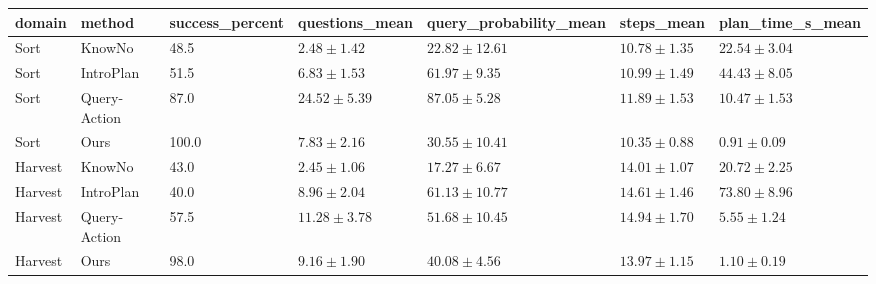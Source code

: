 \begin{tabular}{lllllll}
\hline
domain & method & success\_percent & questions\_mean & query\_probability\_mean & steps\_mean & plan\_time\_s\_mean \\
\hline
Sort & KnowNo & 48.5 & $2.48 \pm 1.42$ & $22.82 \pm 12.61$ & $10.78 \pm 1.35$ & $22.54 \pm 3.04$ \\
Sort & IntroPlan & 51.5 & $6.83 \pm 1.53$ & $61.97 \pm 9.35$ & $10.99 \pm 1.49$ & $44.43 \pm 8.05$ \\
Sort & Query-Action & 87.0 & $24.52 \pm 5.39$ & $87.05 \pm 5.28$ & $11.89 \pm 1.53$ & $10.47 \pm 1.53$ \\
Sort & Ours & 100.0 & $7.83 \pm 2.16$ & $30.55 \pm 10.41$ & $10.35 \pm 0.88$ & $0.91 \pm 0.09$ \\
Harvest & KnowNo & 43.0 & $2.45 \pm 1.06$ & $17.27 \pm 6.67$ & $14.01 \pm 1.07$ & $20.72 \pm 2.25$ \\
Harvest & IntroPlan & 40.0 & $8.96 \pm 2.04$ & $61.13 \pm 10.77$ & $14.61 \pm 1.46$ & $73.80 \pm 8.96$ \\
Harvest & Query-Action & 57.5 & $11.28 \pm 3.78$ & $51.68 \pm 10.45$ & $14.94 \pm 1.70$ & $5.55 \pm 1.24$ \\
Harvest & Ours & 98.0 & $9.16 \pm 1.90$ & $40.08 \pm 4.56$ & $13.97 \pm 1.15$ & $1.10 \pm 0.19$ \\
\hline
\end{tabular}
